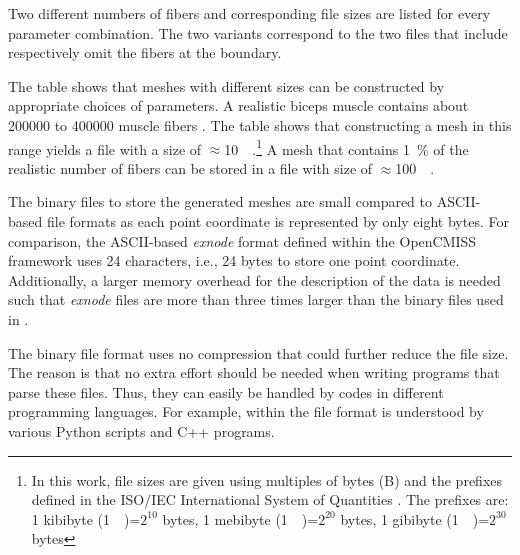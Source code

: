 Two different numbers of fibers and corresponding file sizes are listed for every parameter combination. The two variants correspond to the two files that include respectively omit the fibers at the boundary.

The table shows that meshes with different sizes can be constructed by appropriate choices of parameters. A realistic biceps muscle contains about \num{200000} to \num{400000} muscle fibers \cite{MacDougall1984}. The table shows that constructing a mesh in this range yields a file with a size of $\approx$\SI{10}{\gibi\byte}.\footnote{
In this work, file sizes are given using multiples of bytes (B) and the prefixes defined in the ISO/IEC International System of Quantities \cite{ISOmebi}. The prefixes are: 1 kibibyte (\SI{1}{\kibi\byte})=$2^{10}$ bytes, 1 mebibyte (\SI{1}{\mebi\byte})=$2^{20}$ bytes, 1 gibibyte (\SI{1}{\gibi\byte})=$2^{30}$ bytes}
A mesh that contains \SI{1}{\percent} of the realistic number of fibers can be stored in a file with size of $\approx$\SI{100}{\mebi\byte}.

The binary files to store the generated meshes are small compared to ASCII-based file formats as each point coordinate is represented by only eight bytes. For comparison, the ASCII-based \emph{exnode} format defined within the OpenCMISS framework uses 24 characters, i.e., 24 bytes to store one point coordinate. Additionally, a larger memory overhead for the description of the data is needed such that \emph{exnode} files are more than three times larger than the binary files used in \opendihu{}.

The binary file format uses no compression that could further reduce the file size. The reason is that no extra effort should be needed when writing programs that parse these files. Thus, they can easily be handled by codes in different programming languages. For example, within \opendihu{} the file format is understood by various Python scripts and C++ programs.

